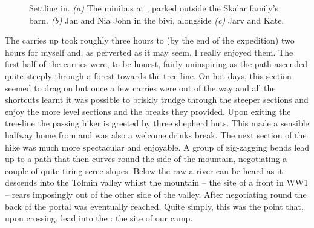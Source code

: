 \begin{figure}[t!]
\begin{subfigure}[t]{0.49\textwidth}
			\centering
			\caption{}\label{jarv kate}
		\end{subfigure}
		\caption{Settling in.
  \textit{(a)} The minibus at , parked outside the Skalar family's barn. 
  \textit{(b)} Jan and Nia John in the bivi, alongside 
  \textit{(c)} Jarv and Kate. }
	\end{figure}


The carries up took roughly three hours to (by the end of the expedition)
two hours for myself and, as perverted as it may seem, I really enjoyed
them. The first half of the carries were, to be honest, fairly
uninspiring as the path ascended quite steeply through a forest towards
the tree line. On hot days, this section seemed to drag on but once a
few carries were out of the way and all the shortcuts learnt it was
possible to briskly trudge through the steeper sections and enjoy the
more level sections and the breaks they provided. Upon exiting the
tree-line the passing hiker is greeted by three shepherd huts. This made
a sensible halfway home from  and was also a welcome drinks
break. The next section of the hike was much more spectacular and
enjoyable. A group of zig-zagging bends lead up to a path that then
curves round the side of the mountain, negotiating a couple of quite
tiring scree-slopes. Below the raw a river can be heard as it descends
into the Tolmin valley whilst the mountain  -- the site of a front in
WW1 -- rears imposingly out of the other side of the valley. After
negotiating round the back of  the portal was eventually reached.
Quite simply, this was the point that, upon crossing, lead into the
: the site of our camp.

